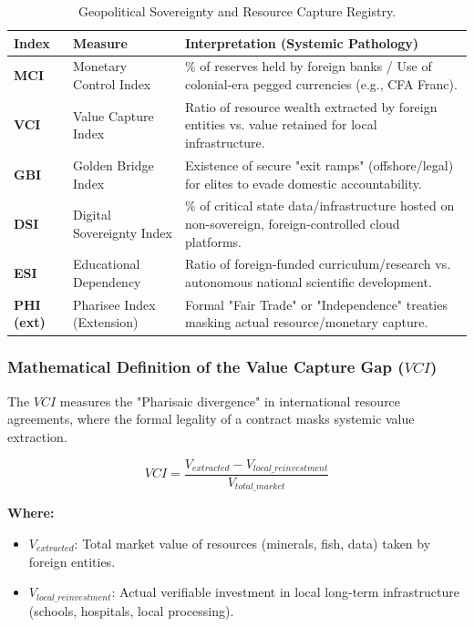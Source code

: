 \documentclass[11pt,a4paper]{article}
\theoremstyle{definition}
\theoremstyle{remark}
\begin{document}
\begin{table}[h!]
\centering
\small
\begin{tabular}{|l|l|l|}
\hline
\textbf{Index} & \textbf{Measure} & \textbf{Interpretation (Systemic Pathology)} \\ \hline
\textbf{MCI} & Monetary Control Index & \% of reserves held by foreign banks / Use of colonial-era pegged currencies (e.g., CFA Franc). \\ \hline
\textbf{VCI} & Value Capture Index & Ratio of resource wealth extracted by foreign entities vs. value retained for local infrastructure. \\ \hline
\textbf{GBI} & Golden Bridge Index & Existence of secure "exit ramps" (offshore/legal) for elites to evade domestic accountability. \\ \hline
\textbf{DSI} & Digital Sovereignty Index & \% of critical state data/infrastructure hosted on non-sovereign, foreign-controlled cloud platforms. \\ \hline
\textbf{ESI} & Educational Dependency & Ratio of foreign-funded curriculum/research vs. autonomous national scientific development. \\ \hline
\textbf{PHI (ext)} & Pharisee Index (Extension) & Formal "Fair Trade" or "Independence" treaties masking actual resource/monetary capture. \\ \hline
\end{tabular}
\caption{Geopolitical Sovereignty and Resource Capture Registry.}
\end{table}

\subsubsection*{Mathematical Definition of the Value Capture Gap ($VCI$)}

The $VCI$ measures the "Pharisaic divergence" in international resource agreements, where the formal legality of a contract masks systemic value extraction.

\begin{equation}
VCI = \frac{V_{extracted} - V_{local\_reinvestment}}{V_{total\_market}}
\end{equation}

\textbf{Where:}
\begin{itemize}
    \item $V_{extracted}$: Total market value of resources (minerals, fish, data) taken by foreign entities.
    \item $V_{local\_reinvestment}$: Actual verifiable investment in local long-term infrastructure (schools, hospitals, local processing).
\end{itemize}
\end{document}
